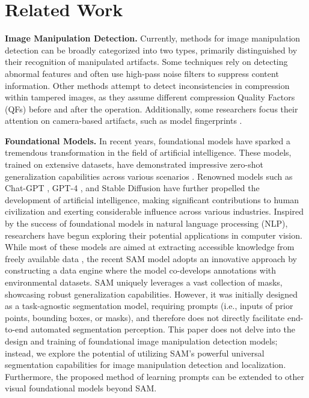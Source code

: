 \section{Related Work}

\noindent\textbf{Image Manipulation Detection.} Currently, methods for image manipulation detection can be broadly categorized into two types, primarily distinguished by their recognition of manipulated artifacts. Some techniques \cite{wu2019mantra, chen2021image, wu2022robust, bi2019rru, hu2020span, yang2020constrained, marra2020full} rely on detecting abnormal features and often use high-pass noise filters \cite{yang2020constrained, li2019localization} to suppress content information. Other methods \cite{park2018double, kwon2022learning, mareen2022comprint} attempt to detect inconsistencies in compression within tampered images, as they assume different compression Quality Factors (QFs) before and after the operation. Additionally, some researchers focus their attention on camera-based artifacts, such as model fingerprints \cite{mareen2022comprint, cozzolino2019noiseprint, cozzolino2015splicebuster}.

\noindent\textbf{Foundational Models.} In recent years, foundational models have sparked a tremendous transformation in the field of artificial intelligence. These models, trained on extensive datasets, have demonstrated impressive zero-shot generalization capabilities across various scenarios \cite{kirillov2023segment, radford2021learning, jia2021scaling, sharif2014cnn}. Renowned models such as Chat-GPT \cite{ouyang2022training}, GPT-4 \cite{achiam2023gpt}, and Stable Diffusion \cite{rombach2022high} have further propelled the development of artificial intelligence, making significant contributions to human civilization and exerting considerable influence across various industries. 
Inspired by the success of foundational models in natural language processing (NLP), researchers have begun exploring their potential applications in computer vision. While most of these models are aimed at extracting accessible knowledge from freely available data \cite{alayrac2022flamingo, radford2021learning, chen2023ovarnet}, the recent SAM model \cite{kirillov2023segment} adopts an innovative approach by constructing a data engine where the model co-develops annotations with environmental datasets. SAM uniquely leverages a vast collection of masks, showcasing robust generalization capabilities. However, it was initially designed as a task-agnostic segmentation model, requiring prompts (i.e., inputs of prior points, bounding boxes, or masks), and therefore does not directly facilitate end-to-end automated segmentation perception.
This paper does not delve into the design and training of foundational image manipulation detection models; instead, we explore the potential of utilizing SAM's powerful universal segmentation capabilities for image manipulation detection and localization. Furthermore, the proposed method of learning prompts can be extended to other visual foundational models beyond SAM.

